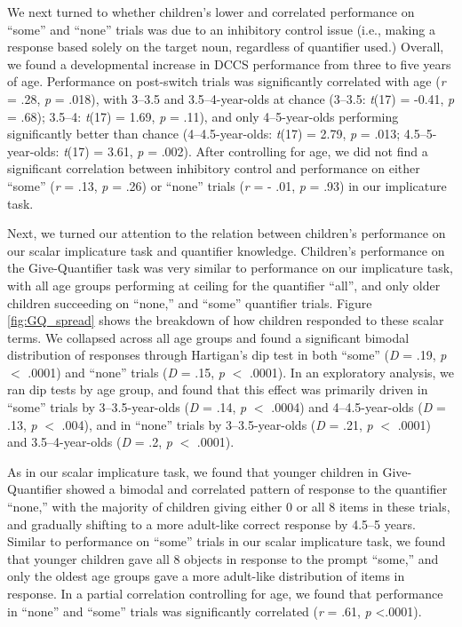 \documentclass[man]{apa2}
\begin{document}
We next turned to whether children's lower and correlated performance on ``some'' and ``none'' trials was due to an inhibitory control issue (i.e., making a response based solely on the target noun, regardless of quantifier used.)
Overall, we found a developmental increase in DCCS performance from three to five years of age. Performance on post-switch trials was significantly correlated with age (\textit{r} = .28, \textit{p} = .018), with 3--3.5 and 3.5--4-year-olds at chance (3--3.5: \emph{t}(17) = -0.41, \emph{p} = .68); 3.5--4: \emph{t}(17) = 1.69, \emph{p} = .11), and only 4--5-year-olds performing significantly better than chance (4--4.5-year-olds: \emph{t}(17) = 2.79, \emph{p} = .013; 4.5--5-year-olds: \emph{t}(17) = 3.61, \emph{p} = .002). After controlling for age, we did not find a significant correlation between inhibitory control and performance on either ``some'' (\textit{r} = .13, \textit{p} = .26) or ``none'' trials (\textit{r} = - .01, \textit{p} = .93) in our implicature task.

Next, we turned our attention to the relation between children's performance on our scalar implicature task and quantifier knowledge. Children's performance on the Give-Quantifier task was very similar to performance on our implicature task, with all age groups performing at ceiling for the quantifier ``all'', and only older children succeeding on ``none,'' and ``some'' quantifier trials. Figure \ref{fig:GQ_spread} shows the breakdown of how children responded to these scalar terms. We collapsed across all age groups and found a significant bimodal distribution of responses through Hartigan's dip test in both ``some'' (\emph{D} = .19, \emph{p} $<$ .0001) and ``none'' trials (\emph{D} = .15, \emph{p} $<$ .0001). In an exploratory analysis, we ran dip tests by age group, and found that this effect was primarily driven in ``some'' trials by 3--3.5-year-olds (\emph{D} = .14, \emph{p} $<$ .0004) and 4--4.5-year-olds (\emph{D} = .13, \emph{p} $<$ .004), and in ``none'' trials by 3--3.5-year-olds (\emph{D} = .21, \emph{p} $<$ .0001) and 3.5--4-year-olds (\emph{D} = .2, \emph{p} $<$ .0001).

As in our scalar implicature task, we found that younger children in Give-Quantifier showed a bimodal and correlated pattern of response to the quantifier ``none,'' with the majority of children giving either 0 or all 8 items in these trials, and gradually shifting to a more adult-like correct response by 4.5--5 years. Similar to performance on ``some'' trials in our scalar implicature task, we found that younger children gave all 8 objects in response to the prompt ``some,'' and only the oldest age groups gave a more adult-like distribution of items in response. In a partial correlation controlling for age, we found that performance in ``none'' and ``some'' trials was significantly correlated (\textit{r} = .61, \textit{p} \textless .0001).
\end{document}
